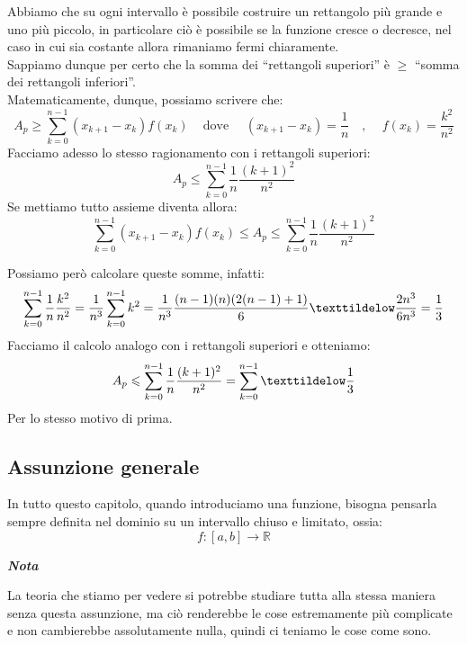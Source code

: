 \documentclass{article}
\theoremstyle{definition}
\newcommand{\R}{\mathbb{R}}
\newcommand{\virgolette}[1]{``#1''}
\begin{document}
Abbiamo che su ogni intervallo è possibile costruire un rettangolo più grande e uno più piccolo, in particolare ciò è possibile se la funzione cresce o decresce, nel caso in cui sia costante allora rimaniamo fermi chiaramente.
\\
Sappiamo dunque per certo che la somma dei \virgolette{rettangoli superiori} è $\geqslant$ \virgolette{somma dei rettangoli inferiori}.
\\
Matematicamente, dunque, possiamo scrivere che:
\begin{equation*}
    A_p \geqslant \sum_{k=0}^{n-1}(x_{k+1}-x_k)f(x_k) \,\,\,\,\,\,\, \mbox{dove}\,\,\,\,\,\,\,\,(x_{k+1}-x_k)=\frac{1}{n}\,\,\,\,\,\,, \,\,\,\,\,\,\, f(x_k)=\frac{k^2}{n^2}
\end{equation*}
Facciamo adesso lo stesso ragionamento con i rettangoli superiori:
\begin{equation*}
    A_p \leqslant \sum_{k=0}^{n-1}\frac{1}{n}\frac{(k+1)^2}{n^2}
\end{equation*}
Se mettiamo tutto assieme diventa allora:
\begin{equation*}
 \sum_{k=0}^{n-1}(x_{k+1}-x_k)f(x_k)  \leqslant   A_p \leqslant \sum _{k=0}^{n-1}\frac{1}{n}\frac{(k+1)^2}{n^2}
\end{equation*}

Possiamo però calcolare queste somme, infatti:
\begin{equation*}
    \sum_{k=0}^{n-1}\frac{1}{n}\frac{k^2}{n^2}=\frac{1}{n^3}\sum_{k=0}^{n-1}k^2=\frac{1}{n^3}\frac{(n-1)(n)(2(n-1)+1)}{6} \texttildelow \frac{2n^3}{6n^3}=\frac{1}{3}
\end{equation*}
Facciamo il calcolo analogo con i rettangoli superiori e otteniamo:
\begin{equation*}
    A_p \leqslant  \sum_{k=0}^{n-1} \frac{1}{n}\frac{(k+1)^2}{n^2}=\sum_{k=0}^{n-1} \texttildelow \frac{1}{3}
\end{equation*}
Per lo stesso motivo di prima.
\subsection{Assunzione generale}
In tutto questo capitolo, quando introduciamo una funzione, bisogna pensarla sempre definita nel dominio su un intervallo chiuso e limitato, ossia:
\begin{equation*}
    f: [a,b] \to \R
\end{equation*}
\begin{center}
    \textbf{\textit{Nota}}
\end{center}
La teoria che stiamo per vedere si potrebbe studiare tutta alla stessa maniera senza questa assunzione, ma ciò renderebbe le cose estremamente più complicate e non cambierebbe assolutamente nulla, quindi ci teniamo le cose come sono.
\\
\end{document}
